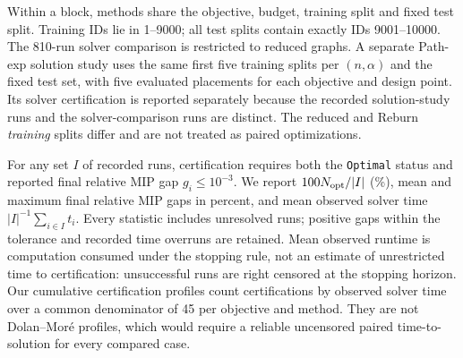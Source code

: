 Within a block, methods share the objective, budget, training split and
fixed test split. Training IDs lie in 1--9000; all test splits contain
exactly IDs 9001--10000. The 810-run solver comparison is restricted
to reduced graphs. A separate Path-exp solution study uses the same
first five training splits per $(n,\alpha)$ and the fixed test set,
with five evaluated placements for each objective and design point.
Its solver certification is reported separately because the recorded
solution-study runs and the solver-comparison runs are distinct. The
reduced and Reburn \emph{training} splits differ and are not treated
as paired optimizations.

For any set $I$ of recorded runs, certification requires both the
\texttt{Optimal} status and reported final relative MIP gap
$g_i\leq 10^{-3}$. We report $100N_{\rm opt}/|I|$ (\%), mean and maximum final
relative MIP gaps in percent, and mean observed solver time
$|I|^{-1}\sum_{i\in I}t_i$. Every statistic includes unresolved runs;
positive gaps within the tolerance and recorded time overruns are
retained. Mean observed runtime is computation consumed under the
stopping rule, not an estimate of unrestricted time to certification:
unsuccessful runs are right censored at the stopping horizon. Our
cumulative certification profiles count certifications by observed
solver time over a common denominator of 45 per objective and method.
They are not Dolan--Mor\'e profiles, which would require a reliable
uncensored paired time-to-solution for every compared case.
